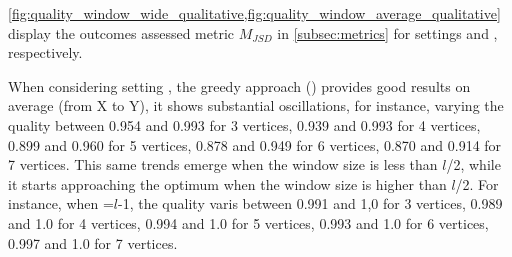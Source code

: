 
\cref{fig:quality_window_wide_qualitative,fig:quality_window_average_qualitative} display the outcomes assessed metric $M_{JSD}$ in \cref{subsec:metrics} for settings \wide and \average, respectively.

When considering setting \wide, the greedy approach () provides good results on average (from X to Y), it shows substantial oscillations, for instance, varying the quality between 0.954 and 0.993 for 3 vertices, 0.939 and 0.993 for 4 vertices, 0.899 and 0.960 for 5 vertices, 0.878 and 0.949 for 6 vertices, 0.870 and 0.914 for 7 vertices. This same trends emerge when the window size is less than $l$/2, while it starts approaching the optimum when the window size is higher than $l$/2. For instance, when \windowsize=$l$-1, the quality varis between  0.991 and  1,0 for 3 vertices, 0.989 and 1.0 for 4 vertices, 0.994 and 1.0 for 5 vertices, 0.993 and 1.0 for 6 vertices, 0.997 and 1.0 for 7 vertices.


